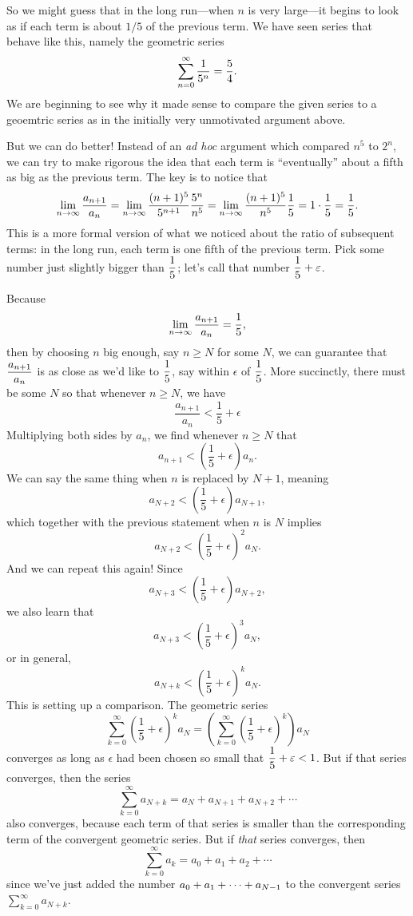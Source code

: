 So we might guess that in the long run---when $n$ is very large---it
begins to look as if each term is about $1/5$ of the previous term. We
have seen series that behave like this, namely the geometric series
$$\sum_{n=0}^\infty {1\over 5^n} = {5\over4}.$$
We are beginning to see why it made sense to compare the given series
to a geoemtric series as in the initially very unmotivated argument
above.

But we can do better!  Instead of an \textit{ad hoc} argument which
compared $n^5$ to $2^n$, we can try to make rigorous the idea that
each term is ``eventually'' about a fifth as big as the previous term.
The key is to notice that
$$
  \lim_{n\to\infty} {a_{n+1}\over a_n}=
  \lim_{n\to\infty} {(n+1)^5\over 5^{n+1}}{5^n\over n^5}=
  \lim_{n\to\infty} {(n+1)^5\over n^5}{1\over 5}=1\cdot {1\over5}
    ={1\over 5}.
$$ 
This is a more formal version of what we noticed about the ratio of
subsequent terms: in the long run, each term is one fifth of the
previous term.  Pick some number just slightly bigger than
$\displaystyle\frac{1}{5}$; let's call that number $\displaystyle\frac{1}{5} + \varepsilon$.


Because
$$\lim_{n\to\infty} {a_{n+1}\over a_n}={1\over5},$$
then by choosing $n$ big enough, say $n\ge N$ for some $N$, we can
guarantee that $\displaystyle\frac{a_{n+1}}{a_n}$ is as close as we'd like to
$\displaystyle\frac{1}{5}$, say within $\epsilon$ of $\displaystyle\frac{1}{5}$.  More
succinctly, there must be some $N$ so that whenever $n \geq N$, we
have
$$
\frac{a_{n+1}}{a_n} < \frac{1}{5} + \epsilon
$$
Multiplying both sides by $a_n$, we find whenever $n \geq N$ that
$$
a_{n+1} <  \left( \frac{1}{5} + \epsilon \right) a_n.
$$
We can say the same thing when $n$ is replaced by $N+1$, meaning
$$
a_{N+2} <  \left( \frac{1}{5} + \epsilon \right) a_{N+1},
$$
which together with the previous statement when $n$ is $N$ implies
$$
a_{N+2} <  \left( \frac{1}{5} + \epsilon \right)^2 a_N.
$$
And we can repeat this again!  Since
$$
a_{N+3} <  \left( \frac{1}{5} + \epsilon \right) a_{N+2},
$$
we also learn that
$$
a_{N+3} <  \left( \frac{1}{5} + \epsilon \right)^3 a_N,
$$
or in general,
$$
a_{N+k} <  \left( \frac{1}{5} + \epsilon \right)^k a_N.
$$
This is setting up a comparison.  The geometric series
$$
\sum_{k=0}^\infty \left( \frac{1}{5} + \epsilon \right)^k a_N = \left( \sum_{k=0}^\infty \left( \frac{1}{5} + \epsilon \right)^k \right) a_N
$$
converges as long as $\epsilon$ had been chosen so small that $\displaystyle\frac{1}{5} + \varepsilon < 1$.  But if that series converges, then the series 
$$
\sum_{k=0}^\infty a_{N+k} = a_N + a_{N+1} + a_{N+2} + \cdots
$$
also converges, because each term of that series is smaller than the corresponding term of the convergent geometric series.  But if \textit{that} series converges, then 
$$
\sum_{k=0}^\infty a_{k} = a_0 + a_{1} + a_{2} + \cdots
$$
since we've just added the number $\displaystyle a_0+a_1+\cdots+a_{N-1}$ to the convergent series $\sum_{k=0}^\infty a_{N+k}$.


